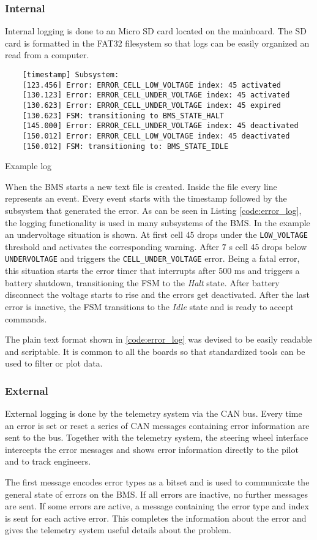 \subsubsection{Internal}
Internal logging is done to an Micro SD card located on the mainboard. The SD card is formatted in the FAT32 filesystem so that logs can be easily organized an read from a computer.
\begin{listing}[H]
	\begin{verbatim}
	[timestamp] Subsystem: 
	[123.456] Error: ERROR_CELL_LOW_VOLTAGE index: 45 activated
	[130.123] Error: ERROR_CELL_UNDER_VOLTAGE index: 45 activated
	[130.623] Error: ERROR_CELL_UNDER_VOLTAGE index: 45 expired
	[130.623] FSM: transitioning to BMS_STATE_HALT
	[145.000] Error: ERROR_CELL_UNDER_VOLTAGE index: 45 deactivated
	[150.012] Error: ERROR_CELL_LOW_VOLTAGE index: 45 deactivated
	[150.012] FSM: transitioning to: BMS_STATE_IDLE
	\end{verbatim}
	\caption{Example log}
	\label{code:error_log}
\end{listing}
When the BMS starts a new text file is created. Inside the file every line represents an event. Every event starts with the timestamp followed by the subsystem that generated the error. As can be seen in Listing \autoref{code:error_log}, the logging functionality is used in many subsystems of the BMS. In the example an undervoltage situation is shown. At first cell 45 drops under the \texttt{LOW\_VOLTAGE} threshold and activates the corresponding warning. After \~7 s cell 45 drops below \texttt{UNDERVOLTAGE} and triggers the \texttt{CELL\_UNDER\_VOLTAGE} error. Being a fatal error, this situation starts the error timer that interrupts after 500 ms and triggers a battery shutdown, transitioning the FSM to the \textit{Halt} state. After battery disconnect the voltage starts to rise and the errors get deactivated. After the last error is inactive, the FSM transitions to the \textit{Idle} state and is ready to accept commands.

The plain text format shown in \autoref{code:error_log} was devised to be easily readable and scriptable. It is common to all the boards so that standardized tools can be used to filter or plot data.

\subsubsection{External}
External logging is done by the telemetry system via the CAN bus. Every time an error is set or reset a series of CAN messages containing error information are sent to the bus. Together with the telemetry system, the steering wheel interface intercepts the error messages and shows error information directly to the pilot and to track engineers.

The first message encodes error types as a bitset and is used to communicate the general state of errors on the BMS. If all errors are inactive, no further messages are sent. If some errors are active, a message containing the error type and index is sent for each active error. This completes the information about the error and gives the telemetry system useful details about the problem.

\newpage

